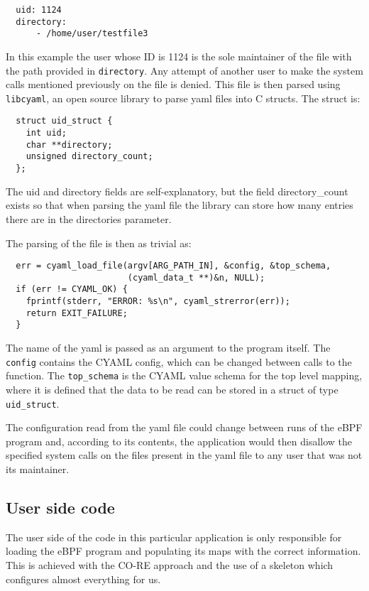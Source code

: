 \begin{lstlisting}
  uid: 1124
  directory:
      - /home/user/testfile3
\end{lstlisting}

In this example the user whose ID is 1124 is the sole maintainer of the file with the path provided in \texttt{directory}. Any attempt of another user to make the system calls mentioned previously on the file is denied.
This file is then parsed using \texttt{libcyaml}, an open source library to parse yaml files into C structs. The struct is:
\begin{lstlisting}
  struct uid_struct {
    int uid;
    char **directory;
    unsigned directory_count;
  };
\end{lstlisting}

The uid and directory fields are self-explanatory, but the field directory\_count exists so that when parsing the yaml file the library can store how many entries there are in the directories parameter.

The parsing of the file is then as trivial as:

\begin{lstlisting}
  err = cyaml_load_file(argv[ARG_PATH_IN], &config, &top_schema,
                        (cyaml_data_t **)&n, NULL);
  if (err != CYAML_OK) {
    fprintf(stderr, "ERROR: %s\n", cyaml_strerror(err));
    return EXIT_FAILURE;
  }
\end{lstlisting}

The name of the yaml is passed as an argument to the program itself. The \texttt{config} contains the CYAML config, which can be changed between calls to the function. The \texttt{top\_schema} is the CYAML value schema for the top level mapping, where it is defined that the data to be read can be stored in a struct of type \texttt{uid\_struct}.

The configuration read from the yaml file could change between runs of the eBPF program and, according to its contents, the application would then disallow the specified system calls on the files present in the yaml file to any user that was not its maintainer.


\subsection{User side code}
The user side of the code in this particular application is only responsible for loading the eBPF program and populating its maps with the correct information.
This is achieved with the CO-RE approach and the use of a skeleton which configures almost everything for us.

